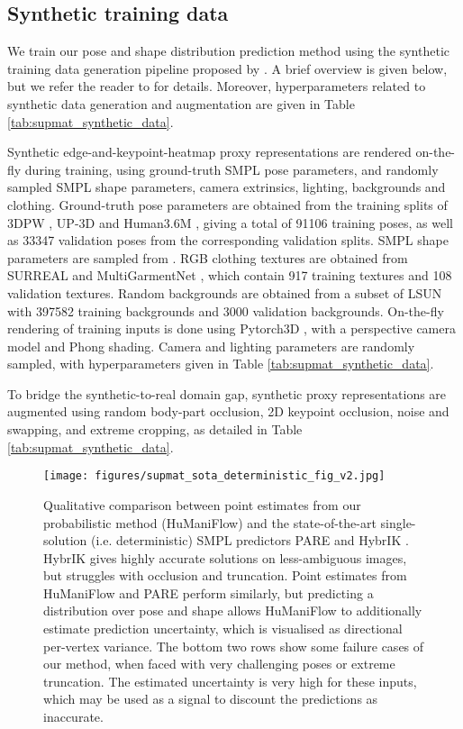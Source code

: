 \subsection{Synthetic training data}

We train our pose and shape distribution prediction method using the synthetic training data generation pipeline proposed by \cite{sengupta2021hierprobhuman}. A brief overview is given below, but we refer the reader to \cite{sengupta2021hierprobhuman} for details. Moreover, hyperparameters related to synthetic data generation and augmentation are given in Table \ref{tab:supmat_synthetic_data}.

Synthetic edge-and-keypoint-heatmap proxy representations are rendered on-the-fly during training, using ground-truth SMPL \cite{SMPL:2015} pose parameters, and randomly sampled SMPL shape parameters, camera extrinsics, lighting, backgrounds and clothing. Ground-truth pose parameters are obtained from the training splits of 3DPW \cite{vonMarcard2018}, UP-3D \cite{Lassner:UP:2017} and Human3.6M \cite{h36m_pami}, giving a total of 91106 training poses, as well as 33347 validation poses from the corresponding validation splits. SMPL shape parameters are sampled from . RGB clothing textures are obtained from SURREAL \cite{varol17_surreal} and MultiGarmentNet \cite{bhatnagar2019mgn}, which contain 917 training textures and 108 validation textures. Random backgrounds are obtained from a subset of LSUN \cite{yu15lsun} with 397582 training backgrounds and 3000 validation backgrounds. On-the-fly rendering of training inputs is done using Pytorch3D \cite{ravi2020pytorch3d}, with a perspective camera model and Phong shading. Camera and lighting parameters are randomly sampled, with hyperparameters given in Table \ref{tab:supmat_synthetic_data}.

To bridge the synthetic-to-real domain gap, synthetic proxy representations are augmented using random body-part occlusion, 2D keypoint occlusion, noise and swapping, and extreme cropping, as detailed in Table \ref{tab:supmat_synthetic_data}.

\begin{figure*}
    \centering
    \texttt{[image: figures/supmat\_sota\_deterministic\_fig\_v2.jpg]}
    \vspace{-0.1cm}
    \caption{Qualitative comparison between point estimates from our probabilistic method (HuManiFlow) and the state-of-the-art single-solution (i.e. deterministic) SMPL predictors PARE \cite{Kocabas_PARE_2021} and HybrIK \cite{li2020hybrik}. HybrIK gives highly accurate solutions on less-ambiguous images, but struggles with occlusion and truncation. Point estimates from HuManiFlow and PARE perform similarly, but predicting a distribution over pose and shape allows HuManiFlow to additionally estimate prediction uncertainty, which is visualised as directional per-vertex variance. The bottom two rows show some failure cases of our method, when faced with very challenging poses or extreme truncation. The estimated uncertainty is very high for these inputs, which may be used as a signal to discount the predictions as inaccurate.}
    \label{fig:supmat_sota_deterministic_fig}
\end{figure*}


